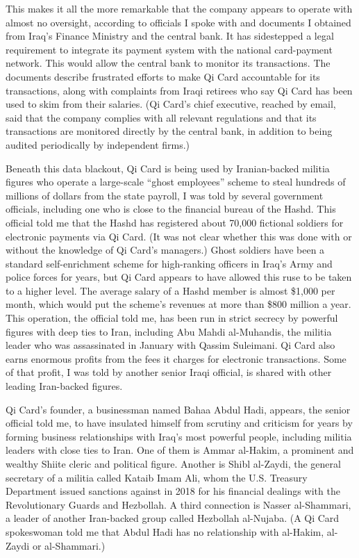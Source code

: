 This makes it all the more remarkable that the company appears to
operate with almost no oversight, according to officials I spoke with
and documents I obtained from Iraq's Finance Ministry and the central
bank. It has sidestepped a legal requirement to integrate its payment
system with the national card-payment network. This would allow the
central bank to monitor its transactions. The documents describe
frustrated efforts to make Qi Card accountable for its transactions,
along with complaints from Iraqi retirees who say Qi Card has been used
to skim from their salaries. (Qi Card's chief executive, reached by
email, said that the company complies with all relevant regulations and
that its transactions are monitored directly by the central bank, in
addition to being audited periodically by independent firms.)

Beneath this data blackout, Qi Card is being used by Iranian-backed
militia figures who operate a large-scale ``ghost employees'' scheme to
steal hundreds of millions of dollars from the state payroll, I was told
by several government officials, including one who is close to the
financial bureau of the Hashd. This official told me that the Hashd has
registered about 70,000 fictional soldiers for electronic payments via
Qi Card. (It was not clear whether this was done with or without the
knowledge of Qi Card's managers.) Ghost soldiers have been a standard
self-enrichment scheme for high-ranking officers in Iraq's Army and
police forces for years, but Qi Card appears to have allowed this ruse
to be taken to a higher level. The average salary of a Hashd member is
almost \$1,000 per month, which would put the scheme's revenues at more
than \$800 million a year. This operation, the official told me, has
been run in strict secrecy by powerful figures with deep ties to Iran,
including Abu Mahdi al-Muhandis, the militia leader who was assassinated
in January with Qassim Suleimani. Qi Card also earns enormous profits
from the fees it charges for electronic transactions. Some of that
profit, I was told by another senior Iraqi official, is shared with
other leading Iran-backed figures.

Qi Card's founder, a businessman named Bahaa Abdul Hadi, appears, the
senior official told me, to have insulated himself from scrutiny and
criticism for years by forming business relationships with Iraq's most
powerful people, including militia leaders with close ties to Iran. One
of them is Ammar al-Hakim, a prominent and wealthy Shiite cleric and
political figure. Another is Shibl al-Zaydi, the general secretary of a
militia called Kataib Imam Ali, whom the U.S. Treasury Department issued
sanctions against in 2018 for his financial dealings with the
Revolutionary Guards and Hezbollah. A third connection is Nasser
al-Shammari, a leader of another Iran-backed group called Hezbollah
al-Nujaba. (A Qi Card spokeswoman told me that Abdul Hadi has no
relationship with al-Hakim, al-Zaydi or al-Shammari.)

